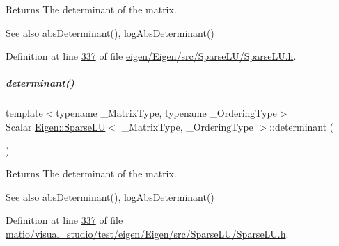\begin{DoxyReturn}{Returns}
The determinant of the matrix.
\end{DoxyReturn}
\begin{DoxySeeAlso}{See also}
\hyperlink{group___sparse_l_u___module_a06fa89424239fb169d408f08252426d0}{abs\+Determinant()}, \hyperlink{group___sparse_l_u___module_a89e30a7df205596784a5a73f4768eaec}{log\+Abs\+Determinant()} 
\end{DoxySeeAlso}


Definition at line \hyperlink{eigen_2_eigen_2src_2_sparse_l_u_2_sparse_l_u_8h_source_l00337}{337} of file \hyperlink{eigen_2_eigen_2src_2_sparse_l_u_2_sparse_l_u_8h_source}{eigen/\+Eigen/src/\+Sparse\+L\+U/\+Sparse\+L\+U.\+h}.

\mbox{\label{group___sparse_l_u___module_a02d63d242d27211b5c5827f5d4fd99ff}} 
\subparagraph{\texorpdfstring{determinant()}{determinant()}\hspace{0.1cm}{\footnotesize\ttfamily [2/2]}}
{\footnotesize\ttfamily template$<$typename \+\_\+\+Matrix\+Type, typename \+\_\+\+Ordering\+Type$>$ \\
Scalar \hyperlink{group___sparse_l_u___module_class_eigen_1_1_sparse_l_u}{Eigen\+::\+Sparse\+LU}$<$ \+\_\+\+Matrix\+Type, \+\_\+\+Ordering\+Type $>$\+::determinant (\begin{DoxyParamCaption}{ }\end{DoxyParamCaption})\hspace{0.3cm}{\ttfamily [inline]}}

\begin{DoxyReturn}{Returns}
The determinant of the matrix.
\end{DoxyReturn}
\begin{DoxySeeAlso}{See also}
\hyperlink{group___sparse_l_u___module_a06fa89424239fb169d408f08252426d0}{abs\+Determinant()}, \hyperlink{group___sparse_l_u___module_a89e30a7df205596784a5a73f4768eaec}{log\+Abs\+Determinant()} 
\end{DoxySeeAlso}


Definition at line \hyperlink{matio_2visual__studio_2test_2eigen_2_eigen_2src_2_sparse_l_u_2_sparse_l_u_8h_source_l00337}{337} of file \hyperlink{matio_2visual__studio_2test_2eigen_2_eigen_2src_2_sparse_l_u_2_sparse_l_u_8h_source}{matio/visual\+\_\+studio/test/eigen/\+Eigen/src/\+Sparse\+L\+U/\+Sparse\+L\+U.\+h}.


